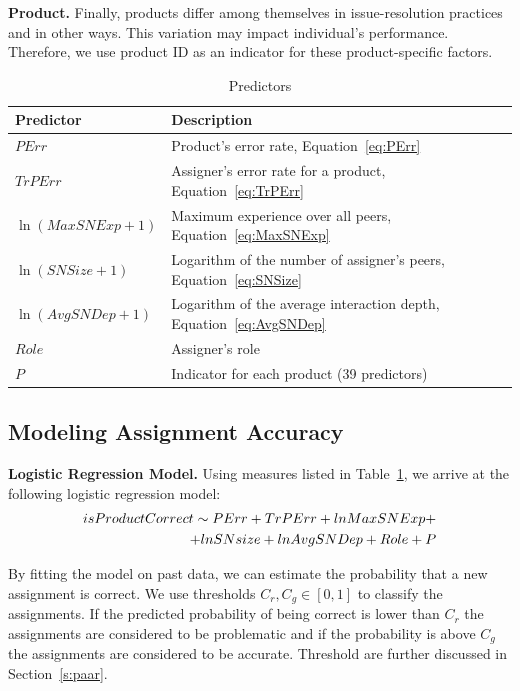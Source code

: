\documentclass{sig-alternate}
\begin{document}
{\bf Product.} Finally, products differ among themselves in issue-resolution
practices and in other ways. This variation may impact
individual's performance. Therefore, we use product ID as an
indicator for these product-specific factors.

\begin{table}
\vspace{-.2cm}
\centering
\caption{Predictors}\label{tab:predictors}
\begin{tabular}{m{1.0in}|m{2in}}  \hline
  Predictor & Description \\
  \hline
  $PErr$ & Product's error rate, Equation~\ref{eq:PErr} \\
  $TrPErr$ & Assigner's error rate for a product, Equation~\ref{eq:TrPErr} \\
  {\small $\ln(MaxSNExp+1)$} & Maximum experience over all peers, Equation~\ref{eq:MaxSNExp}\\
  $\ln(SNSize+1)$ & Logarithm of the number of assigner's peers, Equation~\ref{eq:SNSize} \\
  {\small $\ln(AvgSNDep+1)$} & Logarithm of the average interaction depth, Equation~\ref{eq:AvgSNDep}\ \\
  $Role$ & Assigner's role\\
  $P$ & Indicator for each product (39 predictors) \\\hline
\end{tabular}
\vspace{-.2cm}
\end{table}

\subsection{Modeling Assignment Accuracy}\label{ss:model}
{\bf Logistic Regression Model.}
Using measures listed in Table~\ref{tab:predictors}, we arrive
at the following logistic regression model:
\vspace{-.1cm}
\begin{eqnarray}
\vspace{-.45cm}
  isProductCorrect \sim PErr + TrPErr + lnMaxSNExp+  \nonumber\\
  + lnSNsize+ lnAvgSNDep + Role + P  \nonumber
\vspace{-.35cm}
\end{eqnarray}
\vspace{-.4cm}

By fitting the model on past data, we can estimate the probability that a
new assignment is correct.
We use thresholds $C_r,C_g \in [0,1]$ to classify the
assignments. If the predicted probability of being correct
is lower than $C_r$ the assignments are considered to be problematic
and if the probability is above $C_g$ the assignments are considered
to be accurate. Threshold are further discussed in Section~\ref{s:paar}.
\end{document}
